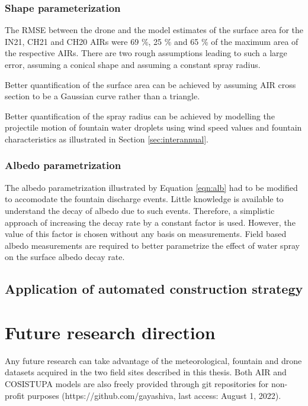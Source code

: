 \subsubsection{Shape parameterization}

The \ac{RMSE} between the drone and the model estimates of the surface area for the IN21, CH21 and CH20 \ac{AIRs}
were 69 \%, 25 \% and 65 \% of the maximum area of the respective \ac{AIRs}. There are two rough assumptions
leading to such a large error, assuming a conical shape and assuming a constant spray radius.

Better quantification of the surface area can be achieved by assuming AIR cross section to be a Gaussian curve
rather than a triangle.

Better quantification of the spray radius can be achieved by modelling the projectile motion of fountain water
droplets using wind speed values and fountain characteristics as illustrated in Section \ref{sec:interannual}.


\subsubsection{Albedo parametrization}

The albedo parametrization illustrated by Equation \ref{eqn:alb} had to be modified to accomodate the fountain
discharge events. Little knowledge is available to understand the decay of albedo due to such events. Therefore,
a simplistic approach of increasing the decay rate by a constant factor is used. However, the value of this
factor is chosen without any basis on measurements. Field based albedo measurements are required to better
parametrize the effect of water spray on the surface albedo decay rate.


\subsection{Application of automated construction strategy}

\section{Future research direction}

Any future research can take advantage of the meteorological, fountain and drone datasets acquired in the two field
sites described in this thesis. Both AIR and COSISTUPA models are also freely provided through git repositories
for non-profit purposes (https://github.com/gayashiva, last access: August 1, 2022).

